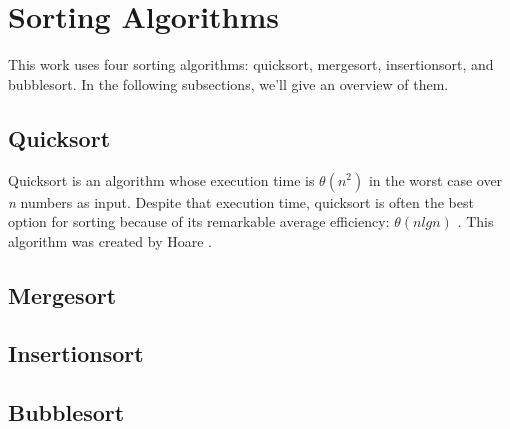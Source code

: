 \section{Sorting Algorithms}

This work uses four sorting algorithms: quicksort, mergesort, insertionsort, and bubblesort. In the following subsections, we'll give an overview of them.

\subsection{Quicksort}

Quicksort is an algorithm whose execution time is $\theta(n^2)$ in the worst case over \textit{n} numbers as input. Despite that execution time, quicksort is often the best option for sorting because of its remarkable average efficiency: $\theta(n lg n)$ \cite{Cormen2009}. This algorithm was created by Hoare \cite{}.



\subsection{Mergesort}

\subsection{Insertionsort}

\subsection{Bubblesort}